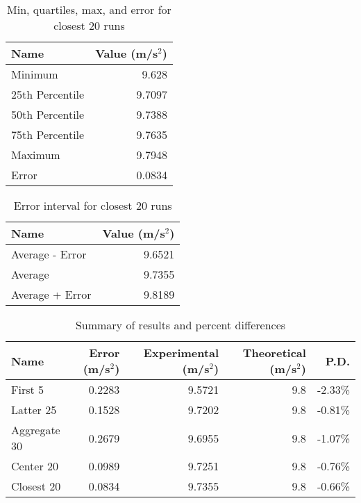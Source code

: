 \begin{table}[ht]
    \centering
    \begin{tabular}{|l|r|}
        \hline
        \textbf{Name} & \textbf{Value} (m/s$^{2}$) \\
        \hline
        Minimum & 9.628 \\
        25th Percentile & 9.7097 \\
        50th Percentile & 9.7388 \\
        75th Percentile & 9.7635 \\
        Maximum & 9.7948 \\
        Error & 0.0834 \\
        \hline
    \end{tabular}
    \caption{Min, quartiles, max, and error for closest 20 runs}
    \label{table:01.describe.20.close}
\end{table}
\begin{table}[ht]
    \centering
    \begin{tabular}{|l|r|}
        \hline
        \textbf{Name} & \textbf{Value} (m/s$^{2}$) \\
        \hline
        Average - Error & 9.6521 \\
        Average & 9.7355 \\
        Average + Error & 9.8189 \\
        \hline
    \end{tabular}
    \caption{Error interval for closest 20 runs}
    \label{table:01.error.20.close}
\end{table}
\begin{table}[ht]
    \centering
    \begin{tabular}{|l|r|r|r|r|}
        \hline
        \textbf{Name} & \textbf{Error} (m/s$^{2}$) & \textbf{Experimental} (m/s$^{2}$) & \textbf{Theoretical} (m/s$^{2}$) & \textbf{P.D.} \\
        \hline
        First 5 & 0.2283 & 9.5721 & 9.8 & -2.33\% \\
        Latter 25 & 0.1528 & 9.7202 & 9.8 & -0.81\% \\
        Aggregate 30 & 0.2679 & 9.6955 & 9.8 & -1.07\% \\
        Center 20 & 0.0989 & 9.7251 & 9.8 & -0.76\% \\
        Closest 20 & 0.0834 & 9.7355 & 9.8 & -0.66\% \\
        \hline
    \end{tabular}
    \caption{Summary of results and percent differences}
    \label{table:01.summary}
\end{table}
